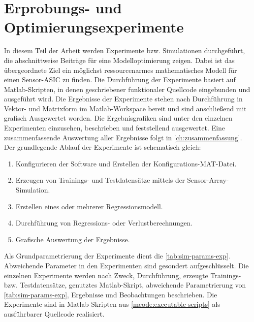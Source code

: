 %

\chapter{Erprobungs- und Optimierungsexperimente}\label{ch:erprobungs-u-opt-exp}


In diesem Teil der Arbeit werden Experimente bzw. Simulationen durchgeführt, die abschnittweise Beiträge für eine Modelloptimierung zeigen. Dabei ist das übergeordnete Ziel ein möglichst ressourcenarmes mathematisches Modell für einen Sensor-ASIC zu finden. Die Durchführung der Experimente basiert auf Matlab-Skripten, in denen geschriebener funktionaler Quellcode eingebunden und ausgeführt wird. Die Ergebnisse der Experimente stehen nach Durchführung in Vektor- und Matrixform im Matlab-Workspace bereit und sind anschließend mit grafisch Ausgewertet worden. Die Ergebnisgrafiken sind unter den einzelnen Experimenten einzusehen, beschrieben und feststellend ausgewertet. Eine zusammenfassende Auswertung aller Ergebnisse folgt in \autoref{ch:zusammenfassung}. Der grundlegende Ablauf der Experimente ist schematisch gleich:


\begin{enumerate}
	\item Konfigurieren der Software und Erstellen der Konfigurations-MAT-Datei.
	\item Erzeugen von Trainings- und Testdatensätze mittels der Sensor-Array-Simulation.
	\item Erstellen eines oder mehrerer Regressionsmodell.
	\item Durchführung von Regressions- oder Verlustberechnungen.
	\item Grafische Auswertung der Ergebnisse.
\end{enumerate}


Als Grundparametrierung der Experimente dient die \autoref{tab:sim-params-exp}. Abweichende Parameter in den Experimenten sind gesondert aufgeschlüsselt. Die einzelnen Experimente werden nach Zweck, Durchführung, erzeugte Trainings- bzw. Testdatensätze, genutztes Matlab-Skript, abweichende Parametrierung von \autoref{tab:sim-params-exp}, Ergebnisse und Beobachtungen beschrieben. Die Experimente sind in Matlab-Skripten aus \autoref{mcode:executable-scripts} als ausführbarer Quellcode realisiert.


\clearpage


